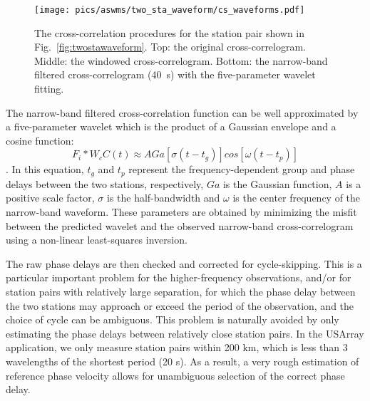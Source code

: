 \begin{figure}
	\center
	\texttt{[image: pics/aswms/two\_sta\_waveform/cs\_waveforms.pdf]}
	\caption[The cross-correlation procedures for the station pair]{The cross-correlation procedures for the station pair shown in Fig.~\ref{fig:twostawaveform}. Top: the original cross-correlogram. Middle: the windowed cross-correlogram. Bottom: the narrow-band filtered cross-correlogram (40~s) with the five-parameter wavelet fitting. }
	\label{fig:cswaveform}
\end{figure}


The narrow-band filtered cross-correlation function can be well approximated by a five-parameter wavelet which is the product of a Gaussian envelope and a cosine function:
\begin{equation}
	F_i \ast W_c C(t) \approx A Ga [\sigma(t-t_g)]cos[\omega(t-t_p)]
\end{equation}
\citep{Gee:1992ww}.  In this equation, $t_g$ and $t_p$ represent the frequency-dependent group and phase delays between the two stations, respectively, $Ga$ is the Gaussian function, $A$ is a positive scale factor, $\sigma$ is the half-bandwidth and $\omega$ is the center frequency of the narrow-band waveform. These parameters are obtained by minimizing the misfit between the predicted wavelet and the observed narrow-band cross-correlogram using a non-linear least-squares inversion.

The raw phase delays are then checked and corrected for cycle-skipping.  This is a particular important problem for the higher-frequency observations, and/or for station pairs with relatively large separation, for which the phase delay between the two stations may approach or exceed the period of the observation, and the choice of cycle can be ambiguous. This problem is naturally avoided by only estimating the phase delays between relatively close station pairs. In the USArray application, we only measure station pairs within 200 km, which is less than 3 wavelengths of the shortest period (20 s). As a result, a very rough estimation of reference phase velocity allows for unambiguous selection of the correct phase delay. 

